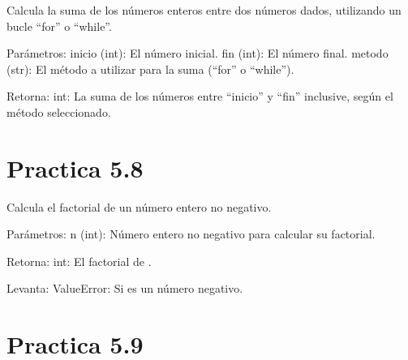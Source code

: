 \documentclass[letterpaper,10pt,spanish]{sphinxmanual}
\begin{document}
\begin{fulllineitems}
\label{\detokenize{pr5:pr5.7.sumar_numeros_entre}}
\pysigstartsignatures
{}
\pysigstopsignatures
\sphinxAtStartPar
Calcula la suma de los números enteros entre dos números dados, utilizando un bucle “for” o “while”.

\sphinxAtStartPar
Parámetros:
inicio (int): El número inicial.
fin (int): El número final.
metodo (str): El método a utilizar para la suma (“for” o “while”).

\sphinxAtStartPar
Retorna:
int: La suma de los números entre “inicio” y “fin” inclusive, según el método seleccionado.

\end{fulllineitems}



\section{Practica 5.8}
\label{\detokenize{pr5:module-pr5.8}}\label{\detokenize{pr5:practica-5-8}}

\begin{fulllineitems}
\label{\detokenize{pr5:pr5.8.calcular_factorial}}
\pysigstartsignatures
{}
\pysigstopsignatures
\sphinxAtStartPar
Calcula el factorial de un número entero no negativo.

\sphinxAtStartPar
Parámetros:
n (int): Número entero no negativo para calcular su factorial.

\sphinxAtStartPar
Retorna:
int: El factorial de .

\sphinxAtStartPar
Levanta:
ValueError: Si  es un número negativo.

\end{fulllineitems}



\section{Practica 5.9}
\label{\detokenize{pr5:module-pr5.9}}\label{\detokenize{pr5:practica-5-9}}
\end{document}
